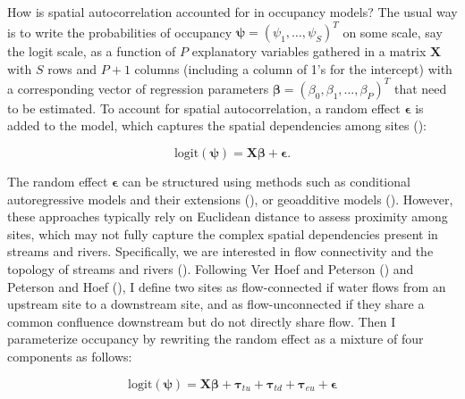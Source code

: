 \documentclass[
  11pt,
  a4paper,
]{article}
\begin{document}
How is spatial autocorrelation accounted for in occupancy models? The usual way is to write the probabilities of occupancy \(\boldsymbol{\psi} = (\psi_1, \ldots, \psi_S)^T\) on some scale, say the logit scale, as a function of \(P\) explanatory variables gathered in a matrix \(\mathbf{X}\) with \(S\) rows and \(P+1\) columns (including a column of 1's for the intercept) with a corresponding vector of regression parameters \(\boldsymbol{\beta} = (\beta_0, \beta_1, \ldots, \beta_P)^T\) that need to be estimated. To account for spatial autocorrelation, a random effect \(\boldsymbol{\epsilon}\) is added to the model, which captures the spatial dependencies among sites ():

\begin{equation}
\text{logit}(\boldsymbol{\psi}) = \mathbf{X} \boldsymbol{\beta} + \boldsymbol{\epsilon}.
\end{equation}

The random effect \(\boldsymbol{\epsilon}\) can be structured using methods such as conditional autoregressive models and their extensions (), or geoadditive models (). However, these approaches typically rely on Euclidean distance to assess proximity among sites, which may not fully capture the complex spatial dependencies present in streams and rivers. Specifically, we are interested in flow connectivity and the topology of streams and rivers (). Following Ver Hoef and Peterson () and Peterson and Hoef (), I define two sites as flow-connected if water flows from an upstream site to a downstream site, and as flow-unconnected if they share a common confluence downstream but do not directly share flow. Then I parameterize occupancy by rewriting the random effect as a mixture of four components as follows:

\begin{equation}
\text{logit}(\boldsymbol{\psi}) = \mathbf{X} \boldsymbol{\beta} + \boldsymbol{\tau}_{tu} + \boldsymbol{\tau}_{td} + \boldsymbol{\tau}_{eu} + \boldsymbol{\epsilon}
\end{equation}
\end{document}
